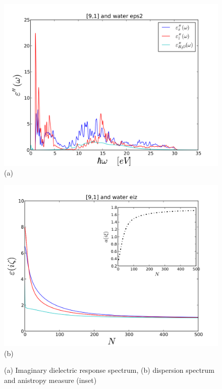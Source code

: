 \documentclass[a4paper]{article}
\begin{document}
\begin{center}
\begin{figure}[t!]
\begin{center}
\begin{minipage}[b]{0.40\textwidth}
\begin{center}
\includegraphics[width=1.4\textwidth]{prop_plots/91w91_eps2.png} (a)
\end{center}
\end{minipage}
\hskip 43pt
\begin{minipage}[b]{0.40\textwidth}
\begin{center}
\includegraphics[width=1.4\textwidth]{prop_plots/91w91_eiz.png} (b)
\end{center}
\end{minipage}
\caption{(a) Imaginary dielectric response spectrum, (b) dispersion spectrum and anistropy measure (inset)}
\label{eiz91}
\end{center}
\end{figure} 


\end{center}
\end{document}
